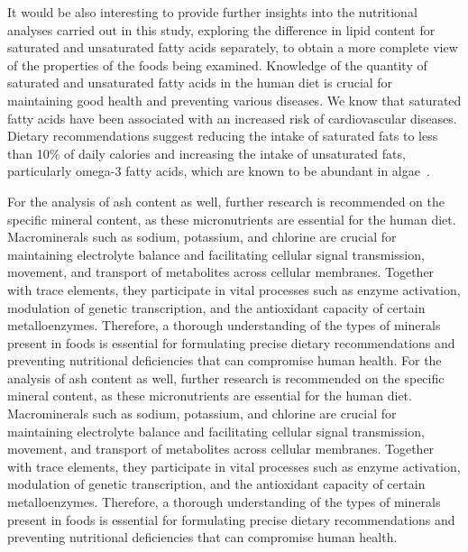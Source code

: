 It would be also interesting to provide further insights into the nutritional analyses carried out in this study, exploring the difference in lipid content for saturated and unsaturated fatty acids separately, to obtain a more complete view of the properties of the foods being examined. Knowledge of the quantity of saturated and unsaturated fatty acids in the human diet is crucial for maintaining good health and preventing various diseases. We know that saturated fatty acids have been associated with an increased risk of cardiovascular diseases. Dietary recommendations suggest reducing the intake of saturated fats to less than \num{10}\% of daily calories and increasing the intake of unsaturated fats, particularly omega-3 fatty acids, which are known to be abundant in algae~\parencite{lunn_health_2006}.

For the analysis of ash content as well, further research is recommended on the specific mineral content, as these micronutrients are essential for the human diet. Macrominerals such as sodium, potassium, and chlorine are crucial for maintaining electrolyte balance and facilitating cellular signal transmission, movement, and transport of metabolites across cellular membranes. Together with trace elements, they participate in vital processes such as enzyme activation, modulation of genetic transcription, and the antioxidant capacity of certain metalloenzymes. Therefore, a thorough understanding of the types of minerals present in foods is essential for formulating precise dietary recommendations and preventing nutritional deficiencies that can compromise human health. For the analysis of ash content as well, further research is recommended on the specific mineral content, as these micronutrients are essential for the human diet. Macrominerals such as sodium, potassium, and chlorine are crucial for maintaining electrolyte balance and facilitating cellular signal transmission, movement, and transport of metabolites across cellular membranes. Together with trace elements, they participate in vital processes such as enzyme activation, modulation of genetic transcription, and the antioxidant capacity of certain metalloenzymes.
Therefore, a thorough understanding of the types of minerals present in foods is essential for formulating precise dietary recommendations and preventing nutritional deficiencies that can compromise human health.
